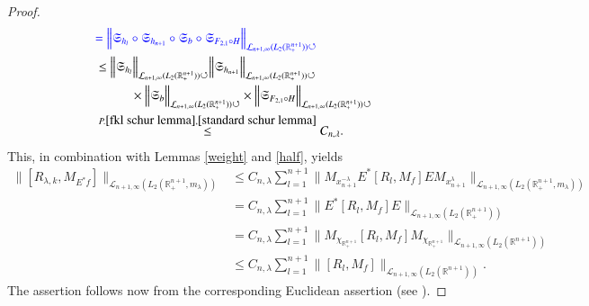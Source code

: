 \documentclass[12pt]{amsart}
\begin{document}
\begin{proof}
\begin{align*}
&{\color{blue}=\Big\|\mathfrak{S}_{h_l}\circ\mathfrak{S}_{h_{n+1}}\circ\mathfrak{S}_b\circ\mathfrak{S}_{F_{2,1}\circ H}\Big\|_{\mathcal{L}_{n+1,\infty}(L_2(\mathbb{R}^{n+1}_+))\circlearrowleft}}\\
&\leq \Big\|\mathfrak{S}_{h_l}\Big\|_{\mathcal{L}_{n+1,\infty}(L_2(\mathbb{R}^{n+1}_+))\circlearrowleft} \Big\|\mathfrak{S}_{h_{n+1}}\Big\|_{\mathcal{L}_{n+1,\infty}(L_2(\mathbb{R}^{n+1}_+))\circlearrowleft}\\
&\hspace{1.0cm}\times\Big\|\mathfrak{S}_b\Big\|_{\mathcal{L}_{n+1,\infty}(L_2(\mathbb{R}^{n+1}_+))\circlearrowleft}\times \Big\|\mathfrak{S}_{F_{2,1}\circ H}\Big\|_{\mathcal{L}_{n+1,\infty}(L_2(\mathbb{R}^{n+1}_+))\circlearrowleft}\\
&\stackrel{P.\ref{fkl schur lemma},\ref{standard schur lemma}}{\leq}{C_{n,\lambda}}.
\end{align*}
This, in combination with Lemmas \ref{weight} and \ref{half}, yields
\begin{align*}
\|[R_{\lambda,k},M_{E^{\ast}f}]\|_{\mathcal{L}_{n+1,\infty}(L_2(\mathbb{R}^{n+1}_+,m_{\lambda}))}
&\leq C_{n,\lambda}\sum_{l=1}^{n+1}\Big\|M_{x_{n+1}^{-\lambda}} E^{\ast}[R_l,M_f]E M_{x_{n+1}^{\lambda}}\Big\|_{\mathcal{L}_{n+1,\infty}(L_2(\mathbb{R}^{n+1}_+,m_{\lambda}))}\\
&=C_{n,\lambda}\sum_{l=1}^{n+1}\Big\|E^{\ast}[R_l,M_f]E\Big\|_{\mathcal{L}_{n+1,\infty}(L_2(\mathbb{R}^{n+1}_+))}\\
&=C_{n,\lambda} \sum_{l=1}^{n+1}\Big\|M_{\chi_{\mathbb{R}_+^{n+1}}}[R_l,M_f]M_{\chi_{\mathbb{R}_+^{n+1}}}\Big\|_{\mathcal{L}_{n+1,\infty}(L_2(\mathbb{R}^{n+1}))}\\
&\leq C_{n,\lambda} \sum_{l=1}^{n+1}\Big\|[R_l,M_f]\Big\|_{\mathcal{L}_{n+1,\infty}(L_2(\mathbb{R}^{n+1}))}.
\end{align*}
The assertion follows now from the corresponding Euclidean assertion (see \cite[Theorem 1]{LMSZ}).
\end{proof}
\end{document}

